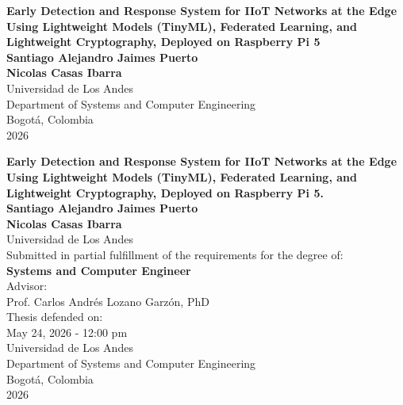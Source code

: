 \begin{center}
\begin{figure}
\centering%
%
\end{figure}
\thispagestyle{empty} \vspace*{1.0cm} \textbf{\Large
Early Detection and Response System for IIoT Networks at the Edge Using Lightweight Models (TinyML), Federated Learning, and Lightweight Cryptography, Deployed on Raspberry Pi 5 }\\[4.0cm]
\Large\textbf{Santiago Alejandro Jaimes Puerto}\\
\Large\textbf{Nicolas Casas Ibarra}\\[5.0cm]
\small Universidad de Los Andes\\
Department of Systems and Computer Engineering\\
Bogot\'a, Colombia\\
2026\\
\end{center}

\newpage{\pagestyle{empty}\cleardoublepage}

\newpage
\begin{center}
\thispagestyle{empty} \vspace*{0cm} \textbf{\Large Early Detection and Response System for IIoT Networks at the Edge Using Lightweight Models (TinyML), Federated Learning, and Lightweight Cryptography, Deployed on Raspberry Pi 5. }\\[3.0cm]
\Large\textbf{Santiago Alejandro Jaimes Puerto}\\
\Large\textbf{Nicolas Casas Ibarra}\\[3.0cm]
\small Universidad de Los Andes\\
\small Submitted in partial fulfillment of the requirements for the degree of:\\
\textbf{Systems and Computer Engineer}\\[2.0cm]
Advisor:\\
Prof. Carlos Andr\'es Lozano Garz\'on, PhD\\

Thesis defended on:\\
May 24, 2026 - 12:00 pm \\[1.5cm]
Universidad de Los Andes\\
Department of Systems and Computer Engineering\\
Bogot\'a, Colombia\\
2026\\
\end{center}

